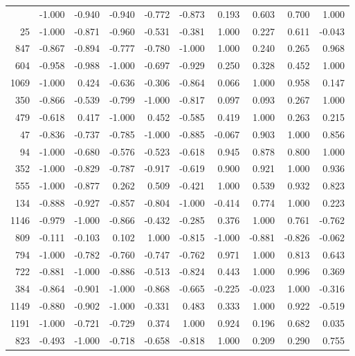 \begin{longtable}{rrrrrrrrrr}
\bottomrule
\endlastfoot
   558 & -1.000 & -0.940 & -0.940 & -0.772 & -0.873 &  0.193 &  0.603 &  0.700 &  1.000 \\
    25 & -1.000 & -0.871 & -0.960 & -0.531 & -0.381 &  1.000 &  0.227 &  0.611 & -0.043 \\
   847 & -0.867 & -0.894 & -0.777 & -0.780 & -1.000 &  1.000 &  0.240 &  0.265 &  0.968 \\
   604 & -0.958 & -0.988 & -1.000 & -0.697 & -0.929 &  0.250 &  0.328 &  0.452 &  1.000 \\
  1069 & -1.000 &  0.424 & -0.636 & -0.306 & -0.864 &  0.066 &  1.000 &  0.958 &  0.147 \\
   350 & -0.866 & -0.539 & -0.799 & -1.000 & -0.817 &  0.097 &  0.093 &  0.267 &  1.000 \\
   479 & -0.618 &  0.417 & -1.000 &  0.452 & -0.585 &  0.419 &  1.000 &  0.263 &  0.215 \\
    47 & -0.836 & -0.737 & -0.785 & -1.000 & -0.885 & -0.067 &  0.903 &  1.000 &  0.856 \\
    94 & -1.000 & -0.680 & -0.576 & -0.523 & -0.618 &  0.945 &  0.878 &  0.800 &  1.000 \\
   352 & -1.000 & -0.829 & -0.787 & -0.917 & -0.619 &  0.900 &  0.921 &  1.000 &  0.936 \\
   555 & -1.000 & -0.877 &  0.262 &  0.509 & -0.421 &  1.000 &  0.539 &  0.932 &  0.823 \\
   134 & -0.888 & -0.927 & -0.857 & -0.804 & -1.000 & -0.414 &  0.774 &  1.000 &  0.223 \\
  1146 & -0.979 & -1.000 & -0.866 & -0.432 & -0.285 &  0.376 &  1.000 &  0.761 & -0.762 \\
   809 & -0.111 & -0.103 &  0.102 &  1.000 & -0.815 & -1.000 & -0.881 & -0.826 & -0.062 \\
   794 & -1.000 & -0.782 & -0.760 & -0.747 & -0.762 &  0.971 &  1.000 &  0.813 &  0.643 \\
   722 & -0.881 & -1.000 & -0.886 & -0.513 & -0.824 &  0.443 &  1.000 &  0.996 &  0.369 \\
   384 & -0.864 & -0.901 & -1.000 & -0.868 & -0.665 & -0.225 & -0.023 &  1.000 & -0.316 \\
  1149 & -0.880 & -0.902 & -1.000 & -0.331 &  0.483 &  0.333 &  1.000 &  0.922 & -0.519 \\
  1191 & -1.000 & -0.721 & -0.729 &  0.374 &  1.000 &  0.924 &  0.196 &  0.682 &  0.035 \\
   823 & -0.493 & -1.000 & -0.718 & -0.658 & -0.818 &  1.000 &  0.209 &  0.290 &  0.755 \\

\end{longtable}
